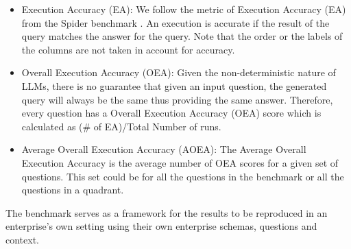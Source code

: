 \documentclass[11pt]{article}
\begin{document}
\begin{itemize}
    \item Execution Accuracy (EA): We follow the metric of Execution Accuracy (EA) from the Spider benchmark \cite{data-spider}. 
An execution is accurate if the result of the query matches the answer for the query. 
Note that the order or the labels of the columns are not taken in account for accuracy.
\item Overall Execution Accuracy (OEA): Given the non-deterministic nature of LLMs, there is no guarantee that given an input question, the generated query will always be the same thus providing the same answer. 
Therefore, every question has a Overall Execution Accuracy (OEA) score which is calculated as (\# of EA)/Total Number of runs. 
\item Average Overall Execution Accuracy (AOEA): The Average Overall Execution Accuracy is the average number of OEA scores for a given set of questions. 
This set could be for all the questions in the benchmark or all the questions in a quadrant. 
\end{itemize}









The benchmark serves as a framework for the results to be reproduced in an enterprise’s own setting using their own enterprise schemas, questions and context. 
\end{document}
